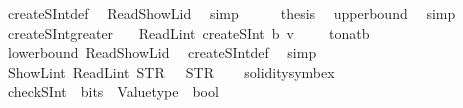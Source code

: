 \begin{isabellebody}
\ createSInt{\isacharunderscore}{\kern0pt}def\ \isamarkupfalse%
\ Read{\isacharunderscore}{\kern0pt}ShowL{\isacharunderscore}{\kern0pt}id\ \isamarkupfalse%
\ simp\isanewline
\ \ \isamarkupfalse%
\ \isamarkupfalse%
\ {\isacharquery}{\kern0pt}thesis\ \isamarkupfalse%
\ upper{\isacharunderscore}{\kern0pt}bound{}\ \isamarkupfalse%
\ simp\isanewline
{}\isamarkupfalse%
%
\endisatagproof
{\isafoldproof}%
%
\isadelimproof
\isanewline
%
\endisadelimproof
\isanewline
{}\isamarkupfalse%
\ createSInt{\isacharunderscore}{\kern0pt}greater{\isacharcolon}{\kern0pt}\isanewline
\ \ \ {\isachardoublequoteopen}ReadL\isactrlsub i\isactrlsub n\isactrlsub t\ {\isacharparenleft}{\kern0pt}createSInt\ b\ v{\isacharparenright}{\kern0pt}\ {\isasymge}\ {\isacharminus}{\kern0pt}\ {\isacharparenleft}{\kern0pt}{}\ {\isacharcircum}{\kern0pt}\ {\isacharparenleft}{\kern0pt}to{\isacharunderscore}{\kern0pt}nat{\isacharparenleft}{\kern0pt}b{\isacharparenright}{\kern0pt}\ {\isacharminus}{\kern0pt}\ {}{\isacharparenright}{\kern0pt}{\isacharparenright}{\kern0pt}{\isachardoublequoteclose}\isanewline
%
\isadelimproof
\ \ %
\endisadelimproof
%
\isatagproof
{}\isamarkupfalse%
\ lower{\isacharunderscore}{\kern0pt}bound{}\ Read{\isacharunderscore}{\kern0pt}ShowL{\isacharunderscore}{\kern0pt}id\ \isamarkupfalse%
\ createSInt{\isacharunderscore}{\kern0pt}def\ \isamarkupfalse%
\ simp%
\endisatagproof
{\isafoldproof}%
%
\isadelimproof
\isanewline
%
\endisadelimproof
\isanewline
\isanewline
{}\isamarkupfalse%
\ {\isachardoublequoteopen}ShowL\isactrlsub i\isactrlsub n\isactrlsub t\ {\isacharparenleft}{\kern0pt}ReadL\isactrlsub i\isactrlsub n\isactrlsub t\ STR\ {\isacharprime}{\kern0pt}{\isacharprime}{\kern0pt}{}{}{}{\isacharprime}{\kern0pt}{\isacharprime}{\kern0pt}{\isacharparenright}{\kern0pt}\ {\isasymnoteq}\ STR\ {\isacharprime}{\kern0pt}{\isacharprime}{\kern0pt}{}{}{}{\isacharprime}{\kern0pt}{\isacharprime}{\kern0pt}{\isachardoublequoteclose}%
\isadelimproof
\ %
\endisadelimproof
%
\isatagproof
{}\isamarkupfalse%
\ solidity{\isacharunderscore}{\kern0pt}symbex%
\endisatagproof
{\isafoldproof}%
%
\isadelimproof
%
\endisadelimproof
\isanewline
\isanewline
{}\isamarkupfalse%
\ checkSInt\ {\isacharcolon}{\kern0pt}{\isacharcolon}{\kern0pt}\ {\isachardoublequoteopen}bits\ {\isasymRightarrow}\ Valuetype\ {\isasymRightarrow}\ bool{\isachardoublequoteclose}\isanewline

\end{isabellebody}
